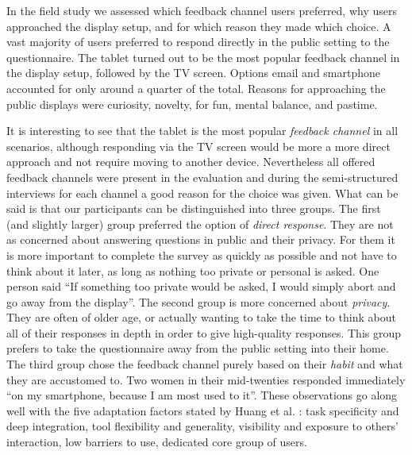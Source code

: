 	In the field study we assessed which feedback channel users preferred, why users approached the display setup, and for which reason they made which choice. A vast majority of users preferred to respond directly in the public setting to the questionnaire. The tablet turned out to be the most popular feedback channel in the display setup, followed by the TV screen. Options email and smartphone accounted for only around a quarter of the total. Reasons for approaching the public displays were curiosity, novelty, for fun, mental balance, and pastime.


	It is interesting to see that the tablet is the most popular \textit{feedback channel} in all scenarios, although responding via the TV screen would be more a more direct approach and not require moving to another device. 
	Nevertheless all offered feedback channels were present in the evaluation and during the semi-structured interviews for each channel a good reason for the choice was given. What can be said is that our participants can be distinguished into three groups. The first (and slightly larger) group preferred the option of \textit{direct response}. They are not as concerned about answering questions in public and their privacy. For them it is more important to complete the survey as quickly as possible and not have to think about it later, as long as nothing too private or personal is asked. One person said ``If something too private would be asked, I would simply abort and go away from the display''. The second group is more concerned about \textit{privacy}. They are often of older age, or actually wanting to take the time to think about all of their responses in depth in order to give high-quality responses. This group prefers to take the questionnaire away from the public setting into their home. The third group chose the feedback channel purely based on their \textit{habit} and what they are accustomed to. Two women in their mid-twenties responded immediately ``on my smartphone, because I am most used to it''.
	These observations go along well with the five adaptation factors stated by Huang et al. \cite{Huang2004}: task specificity and deep integration, tool flexibility and generality, visibility and exposure to others' interaction, low barriers to use, dedicated core group of users.

